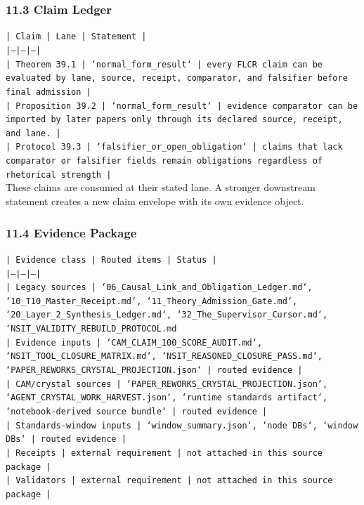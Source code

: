 \documentclass[11pt]{article}
\begin{document}
\subsubsection*{11.3 Claim Ledger}

\noindent\texttt{| Claim | Lane | Statement |}\\
\noindent\texttt{|---|---|---|}\\
\noindent\texttt{| Theorem 39.1 | `normal\_form\_result` | every FLCR claim can be evaluated by lane, source, receipt, comparator, and falsifier before final admission |}\\
\noindent\texttt{| Proposition 39.2 | `normal\_form\_result` | evidence comparator can be imported by later papers only through its declared source, receipt, and lane. |}\\
\noindent\texttt{| Protocol 39.3 | `falsifier\_or\_open\_obligation` | claims that lack comparator or falsifier fields remain obligations regardless of rhetorical strength |}\\

These claims are consumed at their stated lane. A stronger downstream statement
creates a new claim envelope with its own evidence object.

\subsubsection*{11.4 Evidence Package}

\noindent\texttt{| Evidence class | Routed items | Status |}\\
\noindent\texttt{|---|---|---|}\\
\noindent\texttt{| Legacy sources | `06\_Causal\_Link\_and\_Obligation\_Ledger.md`, `10\_T10\_Master\_Receipt.md`, `11\_Theory\_Admission\_Gate.md`, `20\_Layer\_2\_Synthesis\_Ledger.md`, `32\_The\_Supervisor\_Cursor.md`, `NSIT\_VALIDITY\_REBUILD\_PROTOCOL.md}\\
\noindent\texttt{| Evidence inputs | `CAM\_CLAIM\_100\_SCORE\_AUDIT.md`, `NSIT\_TOOL\_CLOSURE\_MATRIX.md`, `NSIT\_REASONED\_CLOSURE\_PASS.md`, `PAPER\_REWORKS\_CRYSTAL\_PROJECTION.json` | routed evidence |}\\
\noindent\texttt{| CAM/crystal sources | `PAPER\_REWORKS\_CRYSTAL\_PROJECTION.json`, `AGENT\_CRYSTAL\_WORK\_HARVEST.json`, `runtime standards artifact`, `notebook-derived source bundle` | routed evidence |}\\
\noindent\texttt{| Standards-window inputs | `window\_summary.json`, `node DBs`, `window DBs` | routed evidence |}\\
\noindent\texttt{| Receipts | external requirement | not attached in this source package |}\\
\noindent\texttt{| Validators | external requirement | not attached in this source package |}\\
\end{document}
